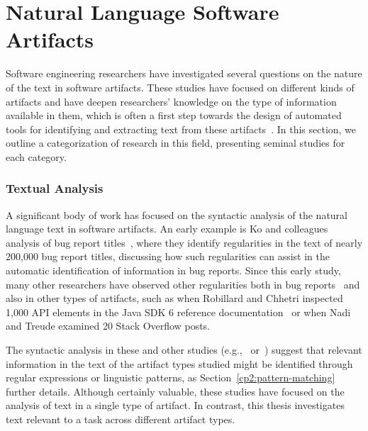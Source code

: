 \section{Natural Language Software Artifacts}
\label{cp2:text-in-se}





Software engineering researchers
have investigated several questions on the nature of the text in software artifacts.
These studies 
have focused on different kinds of artifacts and have deepen
 researchers' knowledge on the type of information available in them,
 which is often a first step towards the design of automated tools 
for identifying and extracting text from these artifacts~\cite{Arya2019, Maalej2013}.
In this section, we outline a categorization of research in this field, presenting 
seminal studies for each category.


\subsubsection{Textual Analysis} 

A significant body of work has 
focused on the syntactic analysis of the natural language text 
in software artifacts. An early example
is Ko and colleagues analysis of bug report titles~\cite{Ko2006},
where they identify regularities in the text of nearly 200,000 bug report titles,
discussing how such regularities can 
assist in the automatic identification 
of information in bug reports. 
Since this early study, many other researchers have 
observed other regularities both in bug reports~\cite{Rastkar2010, Chaparro2016}
and also in other types of artifacts, such as 
when Robillard  and Chhetri inspected 1,000 API elements in the Java SDK 6 
reference documentation~\cite{Maalej2013} or when 
Nadi and Treude examined 20 Stack Overflow posts.


The syntactic analysis in these and other studies (e.g.,~\cite{chaparro2019} or~\cite{lin2019})
suggest that relevant information in the text  
of the artifact types studied 
might be identified through regular expressions or 
linguistic patterns, as Section~\ref{cp2:pattern-matching} further details.
Although certainly valuable, these studies have focused on the analysis of 
text in a single type of artifact. In contrast, this thesis investigates 
text relevant to a task across different artifact types.






